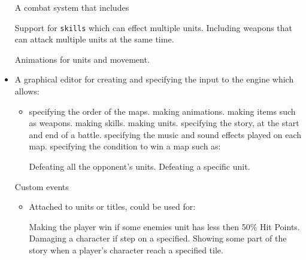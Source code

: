 \begin{itemize}
	
	\tick A combat system that includes 
	\begin{itemize}
		\tick Support for \texttt{skills} which can effect multiple units.
		\tick Including weapons that can attack multiple units at the same time. 
	\end{itemize}
	
	\tick Animations for units and movement.
	
	\item A graphical editor for  creating and specifying the input to the engine which allows:
	\begin{itemize}
		\tick   Creating and editing maps.
		\begin{itemize}
			\tick which also allows placement of enemy units.
		\end{itemize}
		
		\item   specifying the order of the maps.
		\tick   making animations.
		\tick   making items such as weapons.
		\tick   making skills. 
		\tick   making units.
		\tick   specifying the story, at the start and end of a battle.
		\tick   specifying the music and sound effects played on each map.
		\tick   specifying the condition to win a map such as:
		 \begin{itemize}
		 	\tick Defeating all the opponent's units.
		 	\tick Defeating a specific unit.
		 \end{itemize}
	\end{itemize}
	
	\cross Custom events
	\begin{itemize}
		\item Attached to units or titles, could be used for:
		\begin{itemize}
			\cross Making the player win if some enemies unit has less then 50\% Hit Points.
			\cross Damaging a character if step on a specified.
			\cross Showing some part of the story when a player's character reach a specified tile.
		\end{itemize}
	\end{itemize}
	
\end{itemize}